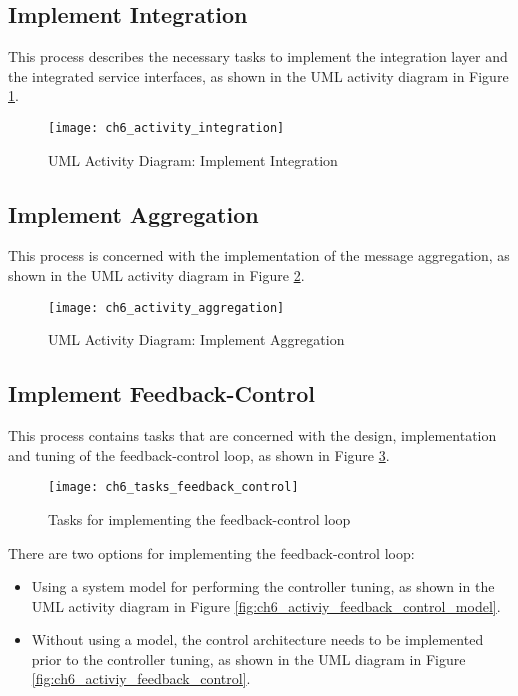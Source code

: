 \subsection{Implement Integration}
This process describes the necessary tasks to implement the integration layer and the integrated service interfaces, as shown in the \ac{UML} activity diagram in Figure \ref{fig:ch6_activiy_integration}.

\begin{figure}[htpb] \centering 
	\texttt{[image: ch6\_activity\_integration]} 
	\caption{\ac{UML} Activity Diagram: Implement Integration} 
	\label{fig:ch6_activiy_integration} 
\end{figure}

\subsection{Implement Aggregation}
This process is concerned with the implementation of the message aggregation, as shown in the \ac{UML} activity diagram in Figure \ref{fig:ch6_activiy_aggregation}.

\begin{figure}[htpb] \centering 
	\texttt{[image: ch6\_activity\_aggregation]} 
	\caption{\ac{UML} Activity Diagram: Implement Aggregation} 
	\label{fig:ch6_activiy_aggregation} 
\end{figure}

\subsection{Implement Feedback-Control}

This process contains tasks that are concerned with the design, implementation and tuning of the feedback-control loop, as shown in Figure \ref{fig:ch6_tasks_feedback_control}.

\begin{figure}[htpb] \centering 
	\texttt{[image: ch6\_tasks\_feedback\_control]} 
	\caption{Tasks for implementing the feedback-control loop} 
	\label{fig:ch6_tasks_feedback_control} 
\end{figure}

There are two options for implementing the feedback-control loop:
\begin{itemize}
	\item Using a system model for performing the controller tuning, as shown in the \ac{UML} activity diagram in Figure \ref{fig:ch6_activiy_feedback_control_model}.
	\item Without using a model, the control architecture needs to be implemented prior to the controller tuning, as shown in the \ac{UML} diagram in Figure \ref{fig:ch6_activiy_feedback_control}.
\end{itemize}

